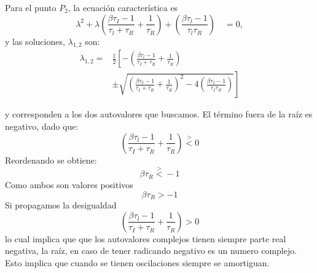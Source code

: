 \documentclass[twocolumn,aps,prl]{revtex4-1}
\begin{document}
Para el punto $P_2$, la ecuación característica es
$$
\lambda^{2}+\lambda\left(\frac{\beta \tau_{I}-1}{\tau_{l}+\tau_{R}}+\frac{1}{\tau_{R}}\right)+\left(\frac{\beta \tau_{l}-1}{\tau_{l} \tau_{R}}\right) \quad=0, 
$$
y las soluciones, $\lambda_{1, 2}$ son:
$$
\begin{aligned}
  \lambda_{1,2} =
  & \frac{1}{2} \left[-
  \left(\frac{\beta \tau_{l}-1}{\tau_{I}+\tau_{R}}+\frac{1}{\tau_{R}}\right)  \right.\\
  &
  \left.
  \pm \sqrt{\left(\frac{\beta \tau_{I}-1}{\tau_{I}+\tau_{R}}+\frac{1}{\tau_{R}}\right)^{2}-4\left(\frac{\beta \tau_{I}-1}{\tau_{I} \tau_{R}}\right)} \right]
\end{aligned}
$$



y corresponden a los dos autovalores que buscamos. El término fuera de la raíz es negativo, dado que:
$$
\left(\frac{\beta \tau_{l}-1}{\tau_{I}+\tau_{R}}+\frac{1}{\tau_{R}}\right) 
\stackrel{>}{<} 0
$$
Reordenando se obtiene:
$$
\beta \tau_{R}
\stackrel{>}{<} -1
$$
Como ambos son valores positivos 
$$
\beta \tau_{R}
> -1
$$
Si propagamos la desigualdad
$$
\left(\frac{\beta \tau_{l}-1}{\tau_{I}+\tau_{R}}+\frac{1}{\tau_{R}}\right) 
> 0
$$
lo cual implica que que los autovalores complejos tienen siempre parte real negativa, la raíz, en caso de tener radicando negativo es un numero complejo. Esto implica que cuando se tienen oscilaciones siempre se amortiguan. 
\end{document}
